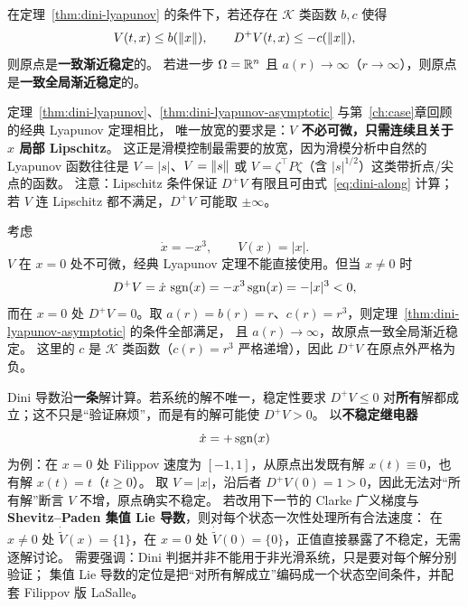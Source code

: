 \begin{theorem}\label{thm:dini-lyapunov-asymptotic}
  在定理~\ref{thm:dini-lyapunov} 的条件下，若还存在 $\mathcal K$ 类函数 $b,c$ 使得
  \begin{equation}\label{eq:dini-asymptotic}
    V(t,x)\le b(\left\lVert x\right\rVert),\qquad D^+V(t,x)\le -c(\left\lVert x\right\rVert),
  \end{equation}
  则原点是\textbf{一致渐近稳定}的。
  若进一步 $\Omega=\mathbb{R}^n$ 且 $a(r)\to\infty$（$r\to\infty$），则原点是\textbf{一致全局渐近稳定}的。
  \cite[Theorem II.6.3, Corollary II.6.4]{roucheStabilityTheoryLiapunov1977}
\end{theorem}

\begin{remark}\label{rem:dini-vs-classical}
  定理~\ref{thm:dini-lyapunov}、\ref{thm:dini-lyapunov-asymptotic} 与第~\ref{ch:case}章回顾的经典 Lyapunov 定理相比，
  唯一放宽的要求是：\textbf{$V$ 不必可微，只需连续且关于 $x$ 局部 Lipschitz}。
  这正是滑模控制最需要的放宽，因为滑模分析中自然的 Lyapunov 函数往往是
  $V=|s|$、$V=\left\lVert s\right\rVert$ 或 $V=\zeta^\top P\zeta$（含 $|s|^{1/2}$）这类带折点/尖点的函数。
  注意：Lipschitz 条件保证 $D^+V$ 有限且可由式~\eqref{eq:dini-along} 计算；
  若 $V$ 连 Lipschitz 都不满足，$D^+V$ 可能取 $\pm\infty$。
\end{remark}

\begin{example}[连续但不可微的 $V=|x|$]\label{ex:dini-x3}
  考虑
  \begin{equation}
    \dot x=-x^3,\qquad V(x)=|x| .
  \end{equation}
  $V$ 在 $x=0$ 处不可微，经典 Lyapunov 定理不能直接使用。但当 $x\neq0$ 时
  \begin{equation}
    D^+V=\dot x\,\operatorname{sgn}(x)=-x^3\operatorname{sgn}(x)=-|x|^3<0,
  \end{equation}
  而在 $x=0$ 处 $D^+V=0$。取 $a(r)=b(r)=r$、$c(r)=r^3$，则定理~\ref{thm:dini-lyapunov-asymptotic} 的条件全部满足，
  且 $a(r)\to\infty$，故原点一致全局渐近稳定。
  这里的 $c$ 是 $\mathcal K$ 类函数（$c(r)=r^3$ 严格递增），因此 $D^+V$ 在原点外严格为负。
\end{example}

\begin{remark}\label{rem:dini-filippov}
  Dini 导数沿\textbf{一条}解计算。若系统的解不唯一，稳定性要求
  $D^+V\le0$ 对\textbf{所有}解都成立；这不只是“验证麻烦”，而是有的解可能使 $D^+V>0$。
  以\textbf{不稳定继电器}
  \begin{equation}
    \dot x=+\operatorname{sgn}(x)
  \end{equation}
  为例：在 $x=0$ 处 Filippov 速度为 $[-1,1]$，从原点出发既有解 $x(t)\equiv0$，也有解 $x(t)=t$（$t\ge0$）。
  取 $V=|x|$，沿后者 $D^+V(0)=1>0$，因此无法对“所有解”断言 $V$ 不增，原点确实不稳定。
  若改用下一节的 Clarke 广义梯度与 \textbf{Shevitz--Paden 集值 Lie 导数}，则对每个状态一次性处理所有合法速度：
  在 $x\neq0$ 处 $\dot{\tilde V}(x)=\{1\}$，在 $x=0$ 处 $\dot{\tilde V}(0)=\{0\}$，正值直接暴露了不稳定，无需逐解讨论。
  需要强调：Dini 判据并非不能用于非光滑系统，只是要对每个解分别验证；
  集值 Lie 导数的定位是把“对所有解成立”编码成一个状态空间条件，并配套 Filippov 版 LaSalle。
\end{remark}

